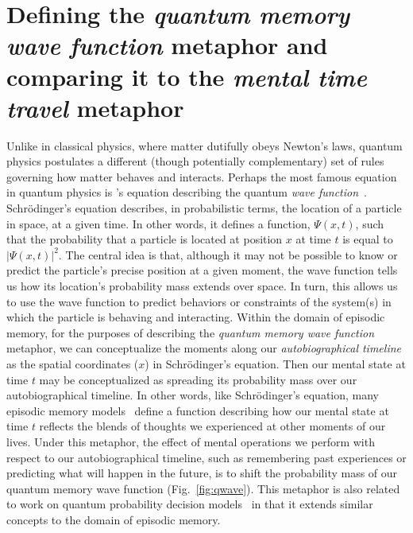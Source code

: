 \documentclass{article}
\begin{document}
\section*{Defining the \textit{quantum memory wave function} metaphor and comparing it to the \textit{mental time travel} metaphor}
Unlike in classical physics, where matter dutifully obeys Newton's laws, quantum physics postulates a different (though potentially complementary) set of rules governing how matter behaves and interacts.  Perhaps the most famous equation in quantum physics is \cite{Schr26}'s equation describing the quantum \textit{wave function}~\citep[this work was also inspired by][]{deBr24}.  Schr\"{o}dinger's equation describes, in probabilistic terms, the location of a particle in space, at a given time.  In other words, it defines a function, $\Psi(x, t)$, such that the probability that a particle is located at position $x$ at time $t$ is equal to $|\Psi(x, t)|^2$.  The central idea is that, although it may not be possible to know or predict the particle's precise position at a given moment, the wave function tells us how its location's probability mass extends over space.  In turn, this allows us to use the wave function to predict behaviors or constraints of the system(s) in which the particle is behaving and interacting.  Within the domain of episodic memory, for the purposes of describing the \textit{quantum memory wave function} metaphor, we can conceptualize the moments along our \textit{autobiographical timeline}~\citep{ArzyEtal09} as the spatial coordinates ($x$) in Schr\"{o}dinger's equation.  Then our mental state at time $t$ may be conceptualized as spreading its probability mass over our autobiographical timeline.  In other words, like Schr\"{o}dinger's equation, many episodic memory models~\citep[e.g.,][]{HowaKaha02a, PolyEtal09, ShanHowa12} define a function describing how our mental state at time $t$ reflects the blends of thoughts we experienced at other moments of our lives.  Under this metaphor, the effect of mental operations we perform with respect to our autobiographical timeline, such as remembering past experiences or predicting what will happen in the future, is to shift the probability mass of our quantum memory wave function (Fig.~\ref{fig:qwave}).  This metaphor is also related to work on quantum probability decision models~\citep[e.g.,][]{KhreEtal18} in that it extends similar concepts to the domain of episodic memory.
\end{document}
